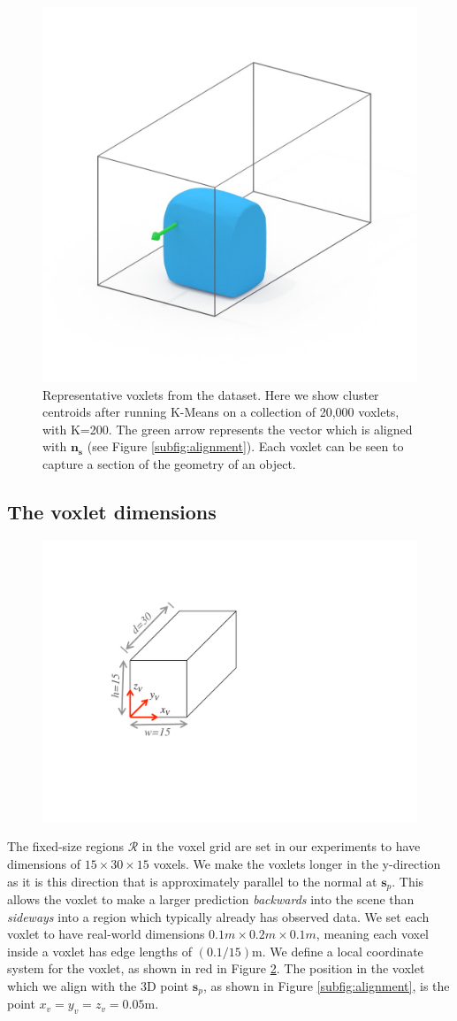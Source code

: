 \documentclass[10pt,twocolumn,letterpaper]{article}
\newcommand{\pixelidx}{\mathbf{s}}
\newcommand{\note}[1]{\textcolor{blue}{NOTE: #1}}
\begin{document}
\begin{figure}
     \includegraphics[width=0.32\columnwidth, clip=true, trim=130 150 120 150]{data/all_voxlets_renders_white/44_marching_cubes.jpg}
     \caption{Representative voxlets from the dataset. Here we show cluster centroids after running K-Means on a collection of 20,000 voxlets, with K=200.
     The green arrow represents the vector which is aligned with $\mathbf{n}_\mathbf{s}$ (see Figure \ref{subfig:alignment}).
     Each voxlet can be seen to capture a section of the geometry of an object.}
     \label{fig:voxlets}
\end{figure}




\pagedepth\maxdimen
\subsection{The voxlet dimensions}
\begin{figure}
  \vspace{-30pt}
  \centering
    \includegraphics[width=0.35\columnwidth, clip=true, trim=120 140 340 80]{single_voxlet}
    \vspace{-15pt}
  \caption{}%
    \label{fig:voxlet_dims}
\end{figure}
The fixed-size regions $\mathcal{R}$ in the voxel grid are set in our experiments to have dimensions of $15 \times 30 \times 15$ voxels.
We make the voxlets longer in the y-direction as it is this direction that is approximately parallel to the normal at $\pixelidx_p$.
This allows the voxlet to make a larger prediction \emph{backwards} into the scene than \emph{sideways} into a region which typically already has observed data.
We set each voxlet to have real-world dimensions $0.1m \times 0.2m \times 0.1m$, meaning each voxel inside a voxlet has edge lengths of $(0.1 / 15)$m.
We define a local coordinate system for the voxlet, as shown in red in Figure \ref{fig:voxlet_dims}.
The position in the voxlet which we align with the 3D point $\pixelidx_p$, as shown in Figure \ref{subfig:alignment}, is the point $x_v = y_v = z_v = 0.05$m.
\end{document}
